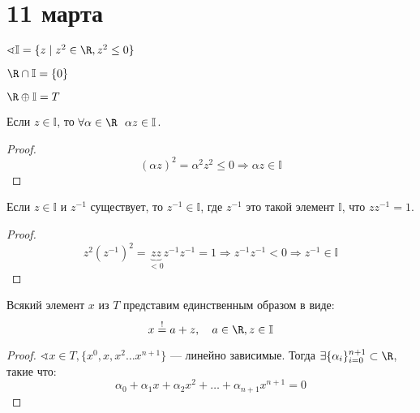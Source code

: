 \chapter{11 марта}

\(\sphericalangle \mathbb{I} = \{z \mid z^2 \in \R, z^2 \leq 0\}\)

\begin{remark}
    \(\R \cap \mathbb{I} = \{0\}\)
\end{remark}

\begin{theorem}
    \(\R \oplus \mathbb{I} = T\)
\end{theorem}

\begin{lemma}
    Если \(z \in \mathbb{I}\), то \(\forall \alpha \in \R \ \ \alpha z \in \mathbb{I}\).
\end{lemma}
\begin{proof}
    \[(\alpha z)^2 = \alpha^2 z^2 \leq 0 \Rightarrow \alpha z \in \mathbb{I}\]
\end{proof}

\begin{lemma}
    Если \(z \in \mathbb{I}\) и \(z^{-1}\) существует, то \(z^{-1} \in \mathbb{I}\), где \(z^{-1}\) это такой элемент \(\mathbb{I}\), что \(zz^{-1} = 1\).
\end{lemma}
\begin{proof}
    \[z^2 (z^{-1})^2 = \underbrace{zz}_{< 0} z^{-1}z^{-1} = 1 \Rightarrow z^{-1}z^{-1} < 0 \Rightarrow z^{-1} \in \mathbb{I}\]
\end{proof}

\begin{lemma}
    Всякий элемент \(x\) из \(T\) представим единственным образом в виде:
    \[x \stackrel{!}{=} a + z, \quad a \in \R, z \in \mathbb{I}\]
\end{lemma}
\begin{proof}
    \(\sphericalangle x \in T, \{x^0, x, x^2 \dots x^{n+1}\}\) --- линейно зависимые. Тогда \(\exists \{\alpha_i\}_{i=0}^{n+1} \subset \R\), такие что:
    \[\alpha_0 + \alpha_1 x + \alpha_2 x^2 + \dots + \alpha_{n+1} x^{n+1} = 0\]
    \unfinished
\end{proof}

